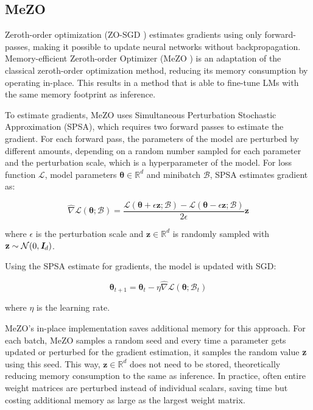 \subsection{MeZO}
Zeroth-order optimization (ZO-SGD \cite{zo-sgd}) estimates gradients using only forward-passes, making it possible to update neural networks without backpropagation. Memory-efficient Zeroth-order Optimizer (MeZO \cite{mezo})  is an adaptation of the classical zeroth-order optimization method, reducing its memory consumption by operating in-place. This results in a method that is able to fine-tune LMs with the same memory footprint as inference. 

To estimate gradients, MeZO uses Simultaneous Perturbation Stochastic Approximation (SPSA), which requires two forward passes to estimate the gradient. For each forward pass, the parameters of the model are perturbed by different amounts, depending on a random number sampled for each parameter and the perturbation scale, which is a hyperparameter of the model. For loss function $\mathcal{L}$, model parameters $\mathbf{\theta} \in \mathbb{R}^d$ and minibatch $\mathcal{B}$, SPSA estimates gradient as:

\begin{equation}
    \hat{\nabla}\mathcal{L}(\mathbf{\theta}; \mathcal{B}) = 
    \frac{\mathcal{L}(\mathbf{\theta} + \epsilon\mathbf{z}; \mathcal{B}) - \mathcal{L}(\mathbf{\theta} - \epsilon\mathbf{z}; \mathcal{B})}
    {2 \epsilon} \mathbf{z}
\end{equation}

where $\epsilon$ is the perturbation scale and $\mathbf{z} \in \mathbb{R}^d$ is randomly sampled with $\mathbf{z} \sim \mathcal{N}(0, \textbf{\em I}_d)$. 

Using the SPSA estimate for gradients, the model is updated with SGD:

\begin{equation}
    \mathbf{\theta}_{t+1} = \mathbf{\theta}_t - \eta \hat{\nabla} \mathcal{L}(\mathbf{\theta}; \mathcal{B}_t)
\end{equation}

where $\eta$ is the learning rate. 

MeZO's in-place implementation saves additional memory for this approach. For each batch, MeZO samples a random seed and every time a parameter gets updated or perturbed for the gradient estimation, it samples the random value \textbf{z} using this seed. This way, $\mathbf{z} \in \mathbb{R}^d$ does not need to be stored, theoretically reducing memory consumption to the same as inference. In practice, often entire weight matrices are perturbed instead of individual scalars, saving time but costing additional memory as large as the largest weight matrix. 

